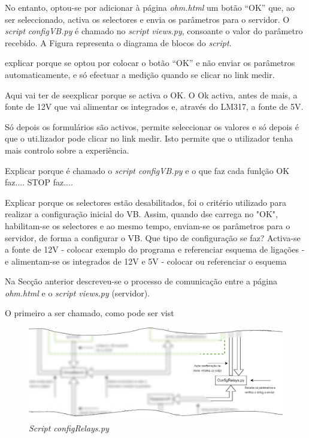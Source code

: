 No entanto, optou-se por adicionar à página \textit{ohm.html} um botão ``OK'' que, ao ser seleccionado, activa os selectores e envia os parâmetros para o servidor. O \textit{script} \textit{configVB.py} é chamado no \textit{script views.py}, consoante o valor do parâmetro recebido. A Figura  representa o diagrama de blocos do \textit{script}.

explicar porque se optou por colocar o botão ``OK'' e não enviar os parâmetros automaticamente, e só efectuar a medição quando se clicar no link medir.

Aqui vai ter de seexplicar porque se activa o OK. O Ok activa, antes de mais, a fonte de 12V que vai alimentar os integrados e, através do LM317, a fonte de 5V. 

Só depois os formulários são activos, permite seleccionar os valores e só depois é que o uti.lizador pode clicar no link medir.
Isto permite que o utilizador tenha mais controlo sobre a experiência.

Explicar porque é chamado o \textit{script configVB.py} e o que faz cada funlção
OK faz....
STOP faz....

Explicar porque os selectores estão desabilitados, foi o critério utilizado para realizar a configuração inicial do VB. Assim, quando dse carrega no "OK", habilitam-se os selectores e ao mesmo tempo, enviam-se os parâmetros para o servidor, de forma a configurar o VB. Que tipo de configuração se faz? Activa-se a fonte de 12V - colocar exemplo do programa e referenciar esquema de ligações - e alimentam-se os integrados de 12V e 5V - colocar ou referenciar o esquema

Na Secção anterior descreveu-se o processo de comunicação entre a página \textit{ohm.html} e o \textit{script views.py} (servidor).


O primeiro a ser chamado, como pode ser vist
\begin{figure}[hbtp]
	\centering
	\includegraphics[width=1\textwidth]{figures/ohm_diagramaCUTRelay.drawio.png}
	\caption{\textit{Script configRelays.py}}
	\label{fig:cutconfigRelays}
\end{figure}

